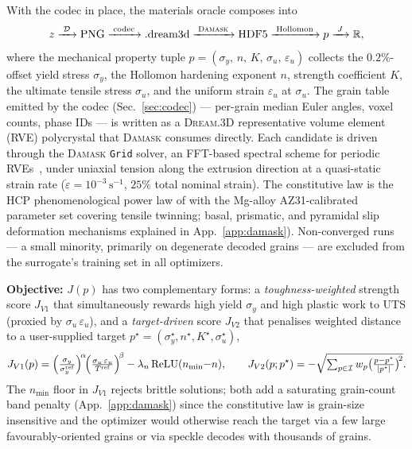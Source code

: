 \documentclass{article}
\newcommand{\damask}{\textsc{Damask}}
\newcommand{\dreamthreed}{\textsc{Dream.3D}}
\newcommand{\Dec}{\mathcal{D}}
\newcommand{\R}{\mathbb{R}}
\newcommand{\sigy}{\sigma_y}
\newcommand{\sigu}{\sigma_u}
\begin{document}
With the codec in place, the materials oracle composes into
\begin{equation*}
  z \xrightarrow{\;\Dec\;} \text{PNG} \xrightarrow{\;\text{codec}\;} \text{.dream3d} \xrightarrow{\;\damask\;} \text{HDF5} \xrightarrow{\;\text{Hollomon}\;} p \xrightarrow{\;J\;} \R,
\end{equation*}
where the mechanical property tuple $p = (\sigy,\,n,\,K,\,\sigu,\,\varepsilon_u)$ collects the $0.2\%$-offset yield stress $\sigy$, the Hollomon hardening exponent $n$, strength coefficient $K$, the ultimate tensile stress $\sigu$, and the uniform strain $\varepsilon_u$ at $\sigu$. The grain table emitted by the codec (Sec.~\ref{sec:codec}) — per-grain median Euler angles, voxel counts, phase IDs — is written as a \dreamthreed{} representative volume element (RVE) polycrystal that \damask{} consumes directly. Each candidate is driven through the \damask{} \texttt{Grid} solver, an FFT-based spectral scheme for periodic RVEs~\citep{roters2019}, under uniaxial tension along the extrusion direction at a quasi-static strain rate ($\dot\varepsilon = 10^{-3}\,\mathrm{s}^{-1}$, $25\%$ total nominal strain). The constitutive law is the HCP phenomenological power law of \citet{roters2019} with the Mg-alloy AZ31-calibrated parameter set covering tensile twinning; basal, prismatic, and pyramidal slip deformation mechanisms explained in App.~\ref{app:damask}). Non-converged runs — a small minority, primarily on degenerate decoded grains — are excluded from the surrogate's training set in all optimizers.

\textbf{Objective:} $J(p)$ has two complementary forms: a \emph{toughness-weighted} strength score $J_{V1}$ that simultaneously rewards high yield $\sigy$ and high plastic work to UTS (proxied by $\sigu\,\varepsilon_u$), and a \emph{target-driven} score $J_{V2}$ that penalises weighted distance to a user-supplied target $p^\star=(\sigy^\star, n^\star, K^\star, \sigu^\star)$,
\begin{equation}
  J_{V1}(p) = \Bigl(\tfrac{\sigy}{\sigy^{\mathrm{ref}}}\Bigr)^{\!\alpha}\!\Bigl(\tfrac{\sigu\,\varepsilon_u}{T^{\mathrm{ref}}}\Bigr)^{\!\beta}
             - \lambda_n\,\mathrm{ReLU}(n_{\min}{-}n),
  \qquad
  J_{V2}(p; p^\star) = -\sqrt{\textstyle\sum_{p\in\mathcal{I}} w_p\bigl(\tfrac{p - p^\star}{|p^\star|}\bigr)^{\!2}}.
  \label{eq:objectives}
\end{equation}
The $n_{\min}$ floor in $J_{V1}$ rejects brittle solutions; both add a saturating grain-count band penalty (App.~\ref{app:damask}) since the constitutive law is grain-size insensitive and the optimizer would otherwise reach the target via a few large favourably-oriented grains or via speckle decodes with thousands of grains.
\end{document}
